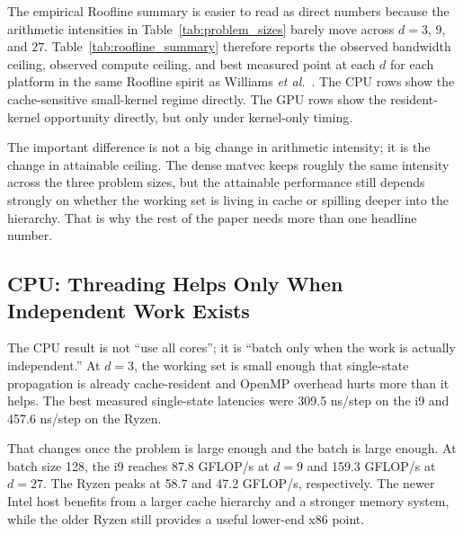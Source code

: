 \documentclass[3p,times,twocolumn]{elsarticle}
\begin{document}
The empirical Roofline summary is easier to read as direct numbers because
the arithmetic intensities in Table~\ref{tab:problem_sizes} barely move
across $d=3$, $9$, and $27$. Table~\ref{tab:roofline_summary} therefore
reports the observed bandwidth ceiling, observed compute ceiling, and best
measured point at each $d$ for each platform in the same Roofline spirit as
Williams \textit{et al.}~\cite{Williams2009}. The CPU rows show the
cache-sensitive small-kernel regime directly. The GPU rows show the
resident-kernel opportunity directly, but only under kernel-only timing.

\begin{table}[t]
  \centering
  \caption{Empirical Roofline summary expressed as direct numbers. Peak
  bandwidth and peak compute are the peak observed ceilings from the tested
  configuration grid on each platform. The $d=3$, $d=9$, and $d=27$ columns
  report the best measured point performance at fixed $d$. GPU rows use
  kernel-only timing.}
  \label{tab:roofline_summary}
  \small
  \resizebox{\textwidth}{!}{}
\end{table}

The important difference is not a big change in arithmetic intensity; it is
the change in attainable ceiling. The dense matvec keeps roughly the same
intensity across the three problem sizes, but the attainable performance
still depends strongly on whether the working set is living in cache or
spilling deeper into the hierarchy. That is why the rest of the paper needs
more than one headline number.

\subsection{CPU: Threading Helps Only When Independent Work Exists}

The CPU result is not ``use all cores''; it is ``batch only when the work is
actually independent.'' At $d=3$, the working set is small enough that
single-state propagation is already cache-resident and OpenMP overhead hurts
more than it helps. The best measured single-state latencies were 309.5
ns/step on the i9 and 457.6 ns/step on the Ryzen.

That changes once the problem is large enough and the batch is large enough.
At batch size 128, the i9 reaches 87.8 GFLOP/s at $d=9$ and 159.3 GFLOP/s at
$d=27$. The Ryzen peaks at 58.7 and 47.2 GFLOP/s, respectively. The newer
Intel host benefits from a larger cache hierarchy and a stronger memory
system, while the older Ryzen still provides a useful lower-end x86 point.
\end{document}

